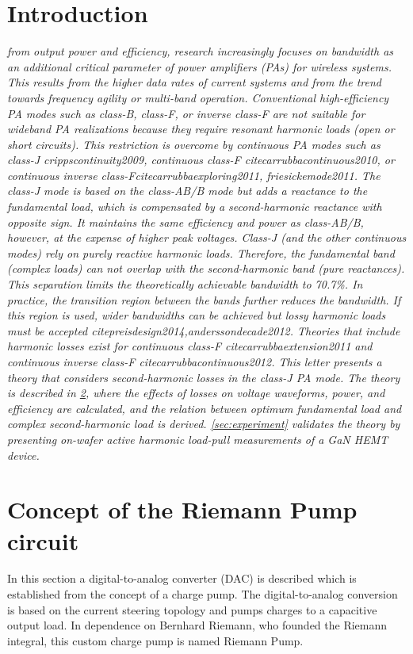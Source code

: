 \documentclass[journal]{IEEEtran}
\begin{document}
\section{Introduction}
\label{sec:introduction}
{\itshape {} from output power and efficiency, research increasingly
focuses on bandwidth as an additional critical parameter of power amplifiers
(PAs) for wireless systems. This results from the higher data rates of current
systems and from the trend towards frequency agility or multi-band operation.
%
Conventional high-efficiency PA modes such as class-B, class-F, or inverse
class-F are not suitable for wideband PA realizations because they require
resonant harmonic loads (open or short circuits). This restriction is overcome
by continuous PA modes such as class-J crippscontinuity2009,
continuous class-F
citecarrubbacontinuous2010,
or continuous inverse class-Fcitecarrubbaexploring2011, friesickemode2011.
%
The class-J mode is based on the class-AB/B mode but adds a reactance to the
fundamental load, which is compensated by a second-harmonic reactance with
opposite sign. It maintains the same efficiency and power as class-AB/B,
however, at the expense of higher peak voltages. Class-J (and the other
continuous modes) rely on purely reactive harmonic loads. Therefore, the
fundamental band (complex loads) can not overlap with the second-harmonic band
(pure reactances). This separation limits the theoretically achievable
bandwidth to 70.7\%. In practice, the transition region between the bands
further reduces the bandwidth. If this region is used, wider bandwidths can be
achieved but lossy harmonic loads must be accepted
cite{preisdesign2014,anderssondecade2012}.
%
Theories that include harmonic losses exist for continuous class-F
cite{carrubbaextension2011}
and continuous inverse class-F
cite{carrubbacontinuous2012}.
This letter presents a theory that considers second-harmonic losses in the
class-J PA mode. The theory is described in \cref{sec:theory}, where the
effects of losses on voltage waveforms, power, and efficiency are calculated,
and the relation between optimum fundamental load and complex second-harmonic
load is derived. \cref{sec:experiment} validates the theory by presenting
on-wafer active harmonic load-pull measurements of a GaN HEMT device.}
%
%
\section{Concept of the Riemann Pump circuit}
\label{sec:theory}
%
In this section a digital-to-analog converter (DAC) is described which is established from the concept of a charge pump.
The digital-to-analog conversion is based on the current steering topology and pumps charges to a capacitive output load.
In dependence on Bernhard Riemann, who founded the Riemann integral, this custom charge pump is named Riemann Pump.
%
\end{document}
